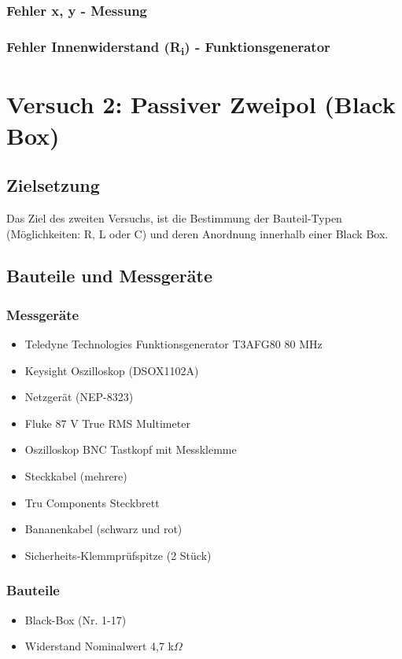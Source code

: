 \documentclass[a4paper,12pt]{article}
\begin{document}
\subsubsection* {Fehler x, y - Messung}

\subsubsection* {Fehler Innenwiderstand (R\textsubscript{i}) - Funktionsgenerator}






\newpage
\section{Versuch 2: Passiver Zweipol (Black Box)}
\subsection{Zielsetzung}
Das Ziel des zweiten Versuchs, ist die Bestimmung der Bauteil-Typen (Möglichkeiten: R, L oder C) und deren Anordnung innerhalb einer
Black Box.

\subsection{Bauteile und Messgeräte}
\subsubsection*{Messgeräte}
\begin{itemize}
\item Teledyne Technologies Funktionsgenerator T3AFG80 80 MHz
\item Keysight Oszilloskop (DSOX1102A)
\item Netzgerät (NEP-8323)
\item Fluke 87 V True RMS Multimeter
\item Oszilloskop BNC Tastkopf mit Messklemme
\item Steckkabel (mehrere)
\item Tru Components Steckbrett
\item Bananenkabel (schwarz und rot)
\item Sicherheits-Klemmprüfspitze (2 Stück)
\end{itemize}

\subsubsection*{Bauteile}
\begin{itemize}
\item Black-Box (Nr. 1-17)
\item Widerstand Nominalwert 4,7 k$\Omega$
\end{itemize}
\end{document}
